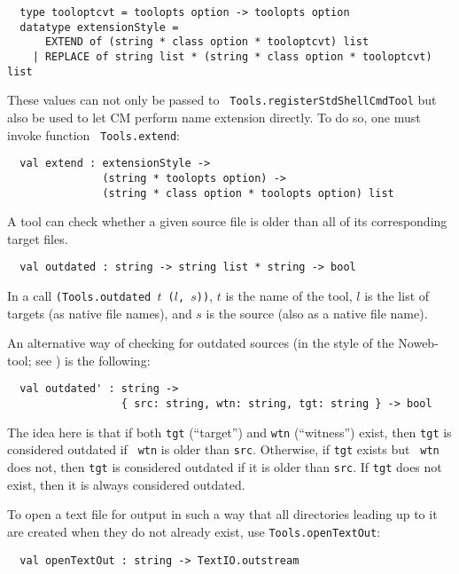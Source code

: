 \begin{lstlisting}
  type tooloptcvt = toolopts option -> toolopts option
  datatype extensionStyle =
      EXTEND of (string * class option * tooloptcvt) list
    | REPLACE of string list * (string * class option * tooloptcvt) list
\end{lstlisting}%

These values can not only be passed to {\tt
Tools.registerStdShellCmdTool} but also be used to let CM perform name
extension directly.  To do so, one must invoke function {\tt
Tools.extend}:

\begin{lstlisting}
  val extend : extensionStyle ->
               (string * toolopts option) ->
               (string * class option * toolopts option) list
\end{lstlisting}%

 A tool can check whether a given
source file is older than all of its corresponding target files.

\begin{lstlisting}
  val outdated : string -> string list * string -> bool
\end{lstlisting}%

In a call {\tt (Tools.outdated $t$ ($l$, $s$))}, $t$ is the name of
the tool, $l$ is the list of targets (as native file names),
and $s$ is the source (also as a native file name).

An alternative way of checking for outdated sources (in the style of
the Noweb-tool; see ) is the
following:

\begin{lstlisting}
  val outdated' : string ->
                  { src: string, wtn: string, tgt: string } -> bool
\end{lstlisting}%

The idea here is that if both {\tt tgt} (``target'') and {\tt wtn}
(``witness'') exist, then {\tt tgt} is considered outdated if {\tt
wtn} is older than {\tt src}.  Otherwise, if {\tt tgt} exists but {\tt
wtn} does not, then {\tt tgt} is considered outdated if it is older
than {\tt src}.  If {\tt tgt} does not exist, then it is always
considered outdated.

  To open a text file for
output in such a way that all directories leading up to it are created
when they do not already exist, use {\tt Tools.openTextOut}:

\begin{lstlisting}
  val openTextOut : string -> TextIO.outstream
\end{lstlisting}%

